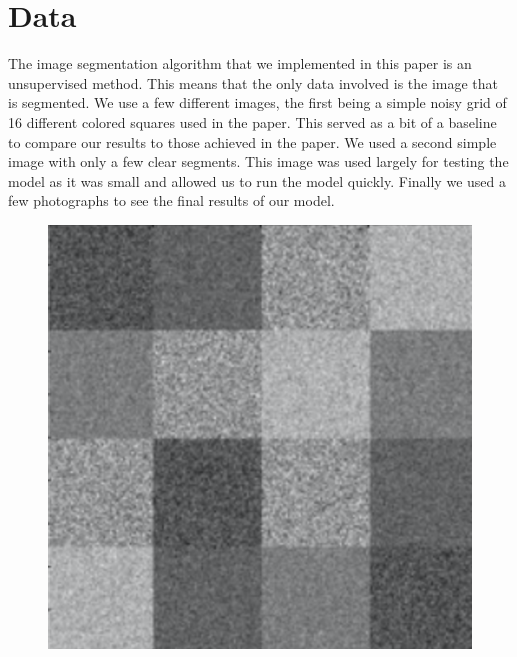 \documentclass[11pt]{article}
\begin{document}
\section{Data}
The image segmentation algorithm that we implemented in this paper is an unsupervised method.
This means that the only data involved is the image that is segmented.
We use a few different images, the first being a simple noisy grid of 16 different colored squares used in the paper.
This served as a bit of a baseline to compare our results to those achieved in the paper.
We used a second simple image with only a few clear segments.
This image was used largely for testing the model as it was small and allowed us to run the model quickly.
Finally we used a few photographs to see the final results of our model.

\begin{figure}[!htb]
\begin{center}
\begin{multicols}{3}
    \includegraphics[height = \linewidth]{squares}\par

\end{multicols}
\end{center}
\end{figure}
\end{document}
